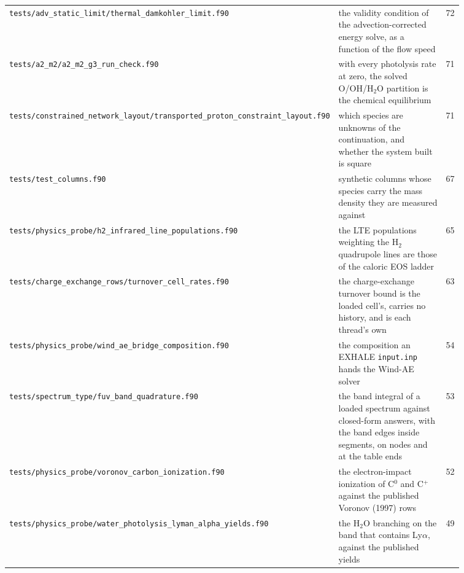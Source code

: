 {\begin{longtable}{@{}>{\raggedright\arraybackslash}p{0.36\linewidth} >{\raggedright\arraybackslash}p{0.50\linewidth} r@{}}
\texttt{tests/\allowbreak adv\_\allowbreak static\_\allowbreak limit/\allowbreak thermal\_\allowbreak damkohler\_\allowbreak limit.f90} & the validity condition of the advection-corrected energy solve, as a function of the flow speed & 72 \\
\texttt{tests/\allowbreak a2\_\allowbreak m2/\allowbreak a2\_\allowbreak m2\_\allowbreak g3\_\allowbreak run\_\allowbreak check.f90} & with every photolysis rate at zero, the solved O/OH/H$_2$O partition is the chemical equilibrium & 71 \\
\texttt{tests/\allowbreak constrained\_\allowbreak network\_\allowbreak layout/\allowbreak transported\_\allowbreak proton\_\allowbreak constraint\_\allowbreak layout.f90} & which species are unknowns of the continuation, and whether the system built is square & 71 \\
\texttt{tests/\allowbreak test\_\allowbreak columns.f90} & synthetic columns whose species carry the mass density they are measured against & 67 \\
\texttt{tests/\allowbreak physics\_\allowbreak probe/\allowbreak h2\_\allowbreak infrared\_\allowbreak line\_\allowbreak populations.f90} & the LTE populations weighting the H$_2$ quadrupole lines are those of the caloric EOS ladder & 65 \\
\texttt{tests/\allowbreak charge\_\allowbreak exchange\_\allowbreak rows/\allowbreak turnover\_\allowbreak cell\_\allowbreak rates.f90} & the charge-exchange turnover bound is the loaded cell's, carries no history, and is each thread's own & 63 \\
\texttt{tests/\allowbreak physics\_\allowbreak probe/\allowbreak wind\_\allowbreak ae\_\allowbreak bridge\_\allowbreak composition.f90} & the composition an EXHALE \texttt{input.inp} hands the Wind-AE solver & 54 \\
\texttt{tests/\allowbreak spectrum\_\allowbreak type/\allowbreak fuv\_\allowbreak band\_\allowbreak quadrature.f90} & the band integral of a loaded spectrum against closed-form answers, with the band edges inside segments, on nodes and at the table ends & 53 \\
\texttt{tests/\allowbreak physics\_\allowbreak probe/\allowbreak voronov\_\allowbreak carbon\_\allowbreak ionization.f90} & the electron-impact ionization of C$^0$ and C$^+$ against the published Voronov (1997) rows & 52 \\
\texttt{tests/\allowbreak physics\_\allowbreak probe/\allowbreak water\_\allowbreak photolysis\_\allowbreak lyman\_\allowbreak alpha\_\allowbreak yields.f90} & the H$_2$O branching on the band that contains Ly$\alpha$, against the published yields & 49 \\

\end{longtable}}

